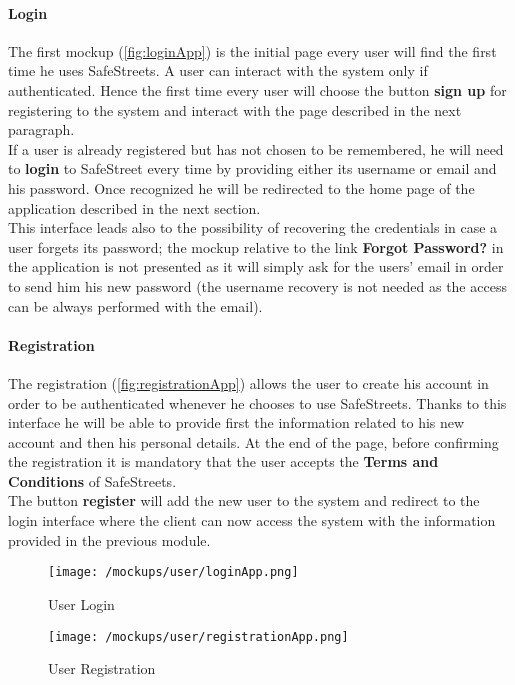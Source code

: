 			\paragraph{Login}
				The first mockup (\autoref{fig:loginApp}) is the initial page every user will find the first time he uses SafeStreets. A user can interact with the system only if authenticated. Hence the first time every user will choose the button \textbf{sign up} for registering to the system and interact with the page described in the next paragraph.\\
				
				If a user is already registered but has not chosen to be remembered, he will need to \textbf{login} to SafeStreet every time by providing either its username or email and his password. Once recognized he will be redirected to the home page of the application described in the next section.\\
				
				This interface leads also to the possibility of recovering the credentials in case a user forgets its password; the mockup relative to the link \textbf{Forgot Password?} in the application is not presented as it will simply ask for the users' email in order to send him his new password (the username recovery is not needed as the access can be always performed with the email).
				
			\paragraph{Registration}
				The registration (\autoref{fig:registrationApp}) allows the user to create his account in order to be authenticated whenever he chooses to use SafeStreets. Thanks to this interface he will be able to provide first the information related to his new account and then his personal details. At the end of the page, before confirming the registration it is mandatory that the user accepts the \textbf{Terms and Conditions} of SafeStreets.\\
				
				The button \textbf{register} will add the new user to the system and redirect to the login interface where the client can now access the system with the information provided in the previous module.
				
			\vspace{0.6cm}
				
			\begin{figure}[ht!]
				\centering
				\begin{minipage}{0.5\textwidth}
					\centering
					\texttt{[image: /mockups/user/loginApp.png]}
					\caption{\label{fig:loginApp} User Login}
				\end{minipage}\hfill
				\begin{minipage}{0.5\textwidth}
					\centering
					\texttt{[image: /mockups/user/registrationApp.png]}
					\caption{\label{fig:registrationApp} User Registration}
				\end{minipage}
			\end{figure}
		
